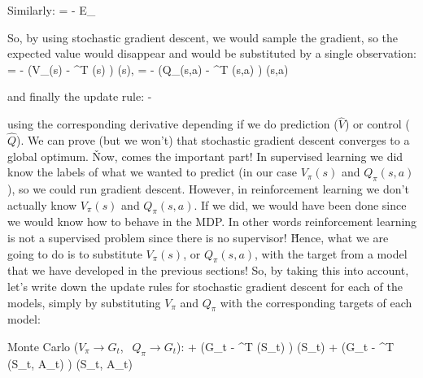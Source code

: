 \vspace{-10pt}

Similarly:
\bse
{} = - E_{\pi} 
\ese

So, by using stochastic gradient descent, we would sample the gradient, so the expected value would disappear and
would be substituted by a single observation:
\bse
{} = - \left(V_{\pi}(s) - ^{T} (s) \right)
\cdot {}(s), \qquad
{} = - \left(Q_{\pi}(s,a) - ^{T} (s,a) \right)
\cdot {}(s,a)
\ese

and finally the update rule:
\bse
{} \coloneqq {} - \alpha {}
\ese

using the corresponding derivative depending if we do prediction ($\hat{V}$) or control ($\hat{Q}$). We can prove
(but we won't) that stochastic gradient descent converges to a global optimum. \v

Now, comes the important part! In supervised learning we did know the labels of what we wanted to predict (in our
case $V_{\pi}(s)$ and $Q_{\pi}(s,a)$), so we could run gradient descent. However, in reinforcement learning we don't
actually know $V_{\pi}(s)$ and $Q_{\pi}(s,a)$. If we did, we would have been done since we would know how to behave
in the MDP\@. In other words reinforcement learning is not a supervised problem since there is no supervisor! \v

Hence, what we are going to do is to substitute $V_{\pi}(s)$, or $Q_{\pi}(s,a)$, with the target from a model that
we have developed in the previous sections! So, by taking this into account, let's write down the update rules for
stochastic gradient descent for each of the models, simply by substituting $V_{\pi}$ and $Q_{\pi}$ with the
corresponding targets of each model:
\bit
\item Monte Carlo ($V_{\pi} \to G_t$, $\:\: Q_{\pi} \to G_t$):
\bse
{} \coloneqq {} + \alpha \left(G_t - ^{T} (S_t) \right)
\cdot {}(S_t)
\ese
\vspace{-10pt}
\bse
{} \coloneqq {} + \alpha \left(G_t - ^{T} (S_t, A_t) \right)
\cdot {}(S_t, A_t)
\ese


